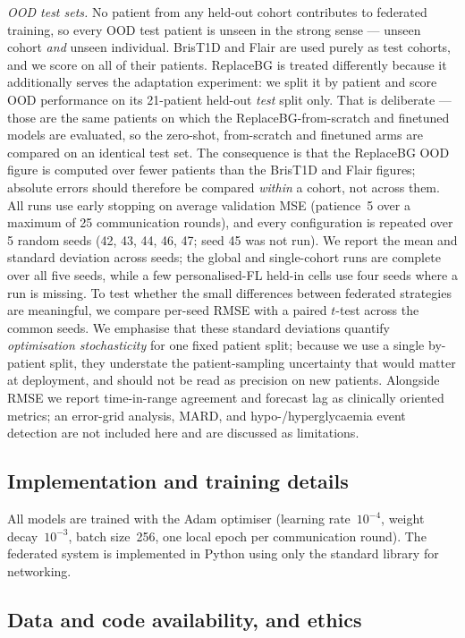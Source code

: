 \documentclass[10pt,letterpaper]{article}
\begin{document}
\emph{OOD test sets.} No patient from any held-out cohort contributes to federated
training, so every OOD test patient is unseen in the strong sense --- unseen
cohort \emph{and} unseen individual. BrisT1D and Flair are used purely as test
cohorts, and we score on all of their patients. ReplaceBG is treated differently
because it additionally serves the adaptation experiment: we split it by patient
and score OOD performance on its 21-patient held-out \emph{test} split only. That
is deliberate --- those are the same patients on which the ReplaceBG-from-scratch
and finetuned models are evaluated, so the zero-shot, from-scratch and finetuned
arms are compared on an identical test set. The consequence is that the ReplaceBG
OOD figure is computed over fewer patients than the BrisT1D and Flair figures;
absolute errors should therefore be compared \emph{within} a cohort, not across
them. All runs use early stopping on average validation MSE (patience~5 over a
maximum of 25 communication rounds), and every configuration is repeated over 5
random seeds (42, 43, 44, 46, 47; seed 45 was not run). We report the mean and
standard deviation across seeds; the global and single-cohort runs are complete
over all five seeds, while a few personalised-FL held-in cells use four seeds
where a run is missing. To test whether the small differences between federated
strategies are meaningful, we compare per-seed RMSE with a paired $t$-test across
the common seeds. We emphasise that these standard deviations quantify
\emph{optimisation stochasticity} for one fixed patient split; because we use a
single by-patient split, they understate the patient-sampling uncertainty that
would matter at deployment, and should not be read as precision on new patients.
Alongside RMSE we report time-in-range agreement and forecast lag as
clinically oriented metrics; an error-grid analysis, MARD, and
hypo-/hyperglycaemia event detection are not included here and are discussed as
limitations.

\subsection*{Implementation and training details}

All models are trained with the Adam optimiser (learning rate~$10^{-4}$, weight
decay~$10^{-3}$, batch size~256, one local epoch per communication round). The
federated system is implemented in Python using only the standard library for
networking.

\subsection*{Data and code availability, and ethics}
\end{document}
